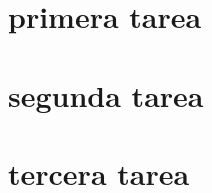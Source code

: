 \chapter{primera tarea}
    
\chapter{segunda tarea}
    
\chapter{tercera tarea}
    
%     
%     
%     
